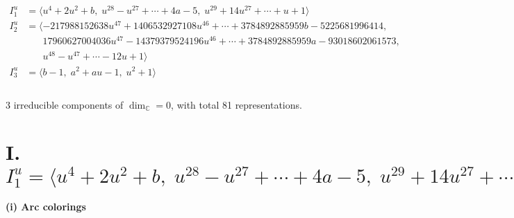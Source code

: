 \documentclass[1p]{elsarticle_modified}
\theoremstyle{definition}
\begin{document}
\begin{align*}
I^u_{1}&=\langle 
u^4+2 u^2+b,\;u^{28}- u^{27}+\cdots+4 a-5,\;u^{29}+14 u^{27}+\cdots+u+1\rangle \\
I^u_{2}&=\langle 
-217988152638 u^{47}+1406532927108 u^{46}+\cdots+3784892885959 b-5225681996414,\\
\phantom{I^u_{2}}&\phantom{= \langle  }17960627004036 u^{47}-14379379524196 u^{46}+\cdots+3784892885959 a-93018602061573,\\
\phantom{I^u_{2}}&\phantom{= \langle  }u^{48}- u^{47}+\cdots-12 u+1\rangle \\
I^u_{3}&=\langle 
b-1,\;a^2+a u-1,\;u^2+1\rangle \\
\\
\end{align*}
\raggedright * 3 irreducible components of $\dim_{\mathbb{C}}=0$, with total 81 representations.\\
\newpage
\renewcommand{\arraystretch}{1}
\centering \section*{I. $I^u_{1}= \langle u^4+2 u^2+b,\;u^{28}- u^{27}+\cdots+4 a-5,\;u^{29}+14 u^{27}+\cdots+u+1 \rangle$}
\flushleft \textbf{(i) Arc colorings}\\
\end{document}
